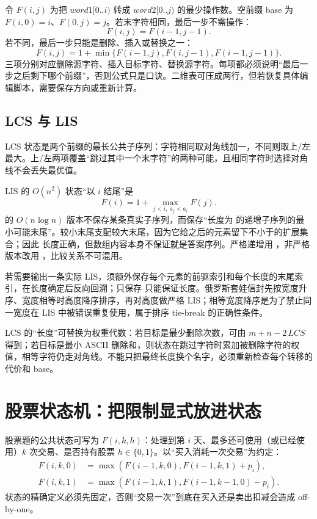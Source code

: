 \documentclass[UTF8,fontset=none,11pt,a4paper]{ctexart}
\begin{document}
令 $F(i,j)$ 为把 $word1[0..i)$ 转成 $word2[0..j)$ 的最少操作数。空前缀 base 为 $F(i,0)=i$、$F(0,j)=j$。若末字符相同，最后一步不需操作：
\[
F(i,j)=F(i-1,j-1).
\]
若不同，最后一步只能是删除、插入或替换之一：
\[
F(i,j)=1+\min\{F(i-1,j),F(i,j-1),F(i-1,j-1)\}.
\]
三项分别对应删除源字符、插入目标字符、替换源字符。每项都必须说明“最后一步之后剩下哪个前缀”，否则公式只是口诀。二维表可压成两行，但若恢复具体编辑脚本，需要保存方向或重新计算。

\subsection{LCS 与 LIS}

LCS 状态是两个前缀的最长公共子序列：字符相同取对角线加一，不同则取上/左最大。上/左两项覆盖“跳过其中一个末字符”的两种可能，且相同字符时选择对角线不会丢失最优值。

LIS 的 $O(n^2)$ 状态“以 $i$ 结尾”是
\[
F(i)=1+\max_{j<i,\ a_j<a_i}F(j).
\]
 的 $O(n\log n)$ 版本不保存某条真实子序列，而保存“长度为  的递增子序列的最小可能末尾”。较小末尾支配较大末尾，因为它给之后的元素留下不小于的扩展集合；因此  长度正确，但数组内容本身不保证就是答案序列。严格递增用 ，非严格版本改用 ，比较关系不可混用。

若需要输出一条实际 LIS，须额外保存每个元素的前驱索引和每个长度的末尾索引，在长度确定后反向回溯；只保存  只能保证长度。俄罗斯套娃信封先按宽度升序、宽度相等时高度降序排序，再对高度做严格 LIS；相等宽度降序是为了禁止同一宽度在 LIS 中被错误重复使用，属于排序 tie-break 的正确性条件。

LCS 的“长度”可替换为权重代数：若目标是最少删除次数，可由 $m+n-2\,LCS$ 得到；若目标是最小 ASCII 删除和，则状态在跳过字符时累加被删除字符的权值，相等字符仍走对角线。不能只把最终长度换个名字，必须重新检查每个转移的代价和 base。

\section{股票状态机：把限制显式放进状态}

股票题的公共状态可写为 $F(i,k,h)$：处理到第 $i$ 天、最多还可使用（或已经使用）$k$ 次交易、是否持有股票 $h\in\{0,1\}$。以“买入消耗一次交易”为约定：
\[
\begin{aligned}
F(i,k,0)&=\max(F(i-1,k,0),F(i-1,k,1)+p_i),\\
F(i,k,1)&=\max(F(i-1,k,1),F(i-1,k-1,0)-p_i).
\end{aligned}
\]
状态的精确定义必须先固定，否则“交易一次”到底在买入还是卖出扣减会造成 off-by-one。
\end{document}
